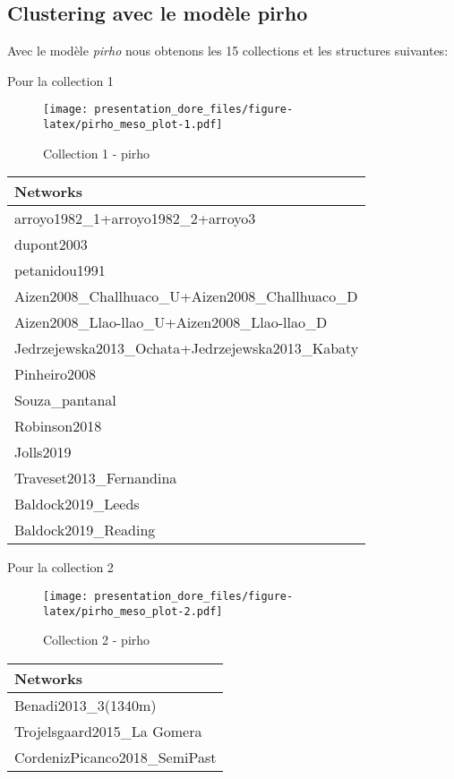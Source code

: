 \documentclass[
]{article}
\begin{document}
\hypertarget{clustering-avec-le-moduxe8le-pirho}{%
\subsection{Clustering avec le modèle
pirho}\label{clustering-avec-le-moduxe8le-pirho}}

Avec le modèle \emph{pirho} nous obtenons les 15 collections et les
structures suivantes:

Pour la collection 1

\begin{figure}
\centering
\texttt{[image: presentation\_dore\_files/figure-latex/pirho\_meso\_plot-1.pdf]}
\caption{Collection 1 - pirho}
\end{figure}

\begin{tabular}{l}
\hline
Networks\\
\hline
arroyo1982\_1+arroyo1982\_2+arroyo3\\
\hline
dupont2003\\
\hline
petanidou1991\\
\hline
Aizen2008\_Challhuaco\_U+Aizen2008\_Challhuaco\_D\\
\hline
Aizen2008\_Llao-llao\_U+Aizen2008\_Llao-llao\_D\\
\hline
Jedrzejewska2013\_Ochata+Jedrzejewska2013\_Kabaty\\
\hline
Pinheiro2008\\
\hline
Souza\_pantanal\\
\hline
Robinson2018\\
\hline
Jolls2019\\
\hline
Traveset2013\_Fernandina\\
\hline
Baldock2019\_Leeds\\
\hline
Baldock2019\_Reading\\
\hline
\end{tabular}

Pour la collection 2

\begin{figure}
\centering
\texttt{[image: presentation\_dore\_files/figure-latex/pirho\_meso\_plot-2.pdf]}
\caption{Collection 2 - pirho}
\end{figure}

\begin{tabular}{l}
\hline
Networks\\
\hline
Benadi2013\_3(1340m)\\
\hline
Trojelsgaard2015\_La Gomera\\
\hline
CordenizPicanco2018\_SemiPast\\
\hline
\end{tabular}
\end{document}
